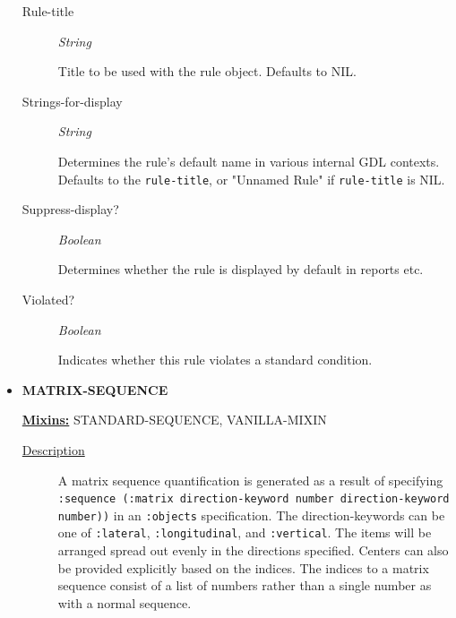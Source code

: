 \documentclass [11pt]{book}
\begin{document}
\begin{itemize}
\begin{description}
\item [Rule-title]
\emph{String}

 Title to be used with the rule object. Defaults to NIL.




\item [Strings-for-display]
\emph{String}

 Determines the rule's default name in various internal GDL contexts. Defaults to
the \texttt{rule-title}, or "Unnamed Rule" if \texttt{rule-title} is NIL.




\item [Suppress-display?]
\emph{Boolean}

 Determines whether the rule is displayed by default in reports etc.




\item [Violated?]
\emph{Boolean}

 Indicates whether this rule violates a standard condition.




\end{description}







\item {}
\label{prim:matrix-sequence}
\textbf{MATRIX-SEQUENCE}


\textbf{
\underline{Mixins:}} STANDARD-SEQUENCE, VANILLA-MIXIN





\begin{description}

\item [
\underline{Description}]


A matrix sequence quantification is
generated as a result of specifying \texttt{:sequence (:matrix
direction-keyword number direction-keyword number))} in an
\texttt{:objects} specification. The direction-keywords can be one of
\texttt{:lateral}, \texttt{:longitudinal}, and \texttt{:vertical}. The
items will be arranged spread out evenly in the directions specified.
Centers can also be provided explicitly based on the indices.  The
indices to a matrix sequence consist of a list of numbers rather than
a single number as with a normal sequence.




\end{description}
\end{itemize}
\end{document}
